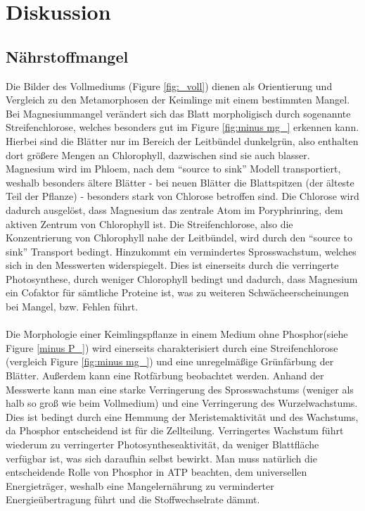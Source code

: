 \documentclass[10pt,a4paper]{article}
\begin{document}
	\section{Diskussion}
	\subsection{Nährstoffmangel}
	Die Bilder des Vollmediums (Figure \ref{fig:_voll}) dienen als Orientierung und Vergleich zu den Metamorphosen der Keimlinge mit einem bestimmten Mangel.\\
	Bei Magnesiummangel verändert sich das Blatt morpholigisch durch sogenannte Streifenchlorose, welches besonders gut im Figure \ref{fig:minus mg_} erkennen kann. Hierbei sind die Blätter nur im Bereich der Leitbündel dunkelgrün, also enthalten dort größere Mengen an Chlorophyll, dazwischen sind sie auch blasser. Magnesium wird im Phloem, nach dem “source to sink”  Modell transportiert, weshalb besonders ältere Blätter - bei neuen Blätter die Blattspitzen (der älteste Teil der Pflanze) - besonders stark von Chlorose betroffen sind. Die Chlorose wird dadurch ausgelöst, dass Magnesium das zentrale Atom im Poryphrinring, dem aktiven Zentrum von Chlorophyll ist. Die Streifenchlorose, also die Konzentrierung von Chlorophyll nahe der Leitbündel, wird durch den “source to sink” Transport bedingt. Hinzukommt ein vermindertes Sprosswachstum, welches sich in den Messwerten widerspiegelt. Dies ist einerseits durch die verringerte Photosynthese, durch weniger Chlorophyll bedingt und dadurch, dass Magnesium ein Cofaktor für sämtliche Proteine ist, was zu weiteren Schwächeerscheinungen bei Mangel, bzw. Fehlen führt. \\
	  \\
	Die Morphologie einer Keimlingspflanze in einem Medium ohne Phosphor(siehe Figure \ref{minus P_}) wird einerseits charakterisiert durch eine Streifenchlorose (vergleich Figure \ref{fig:minus mg_}) und eine unregelmäßige Grünfärbung der Blätter. Außerdem kann eine Rotfärbung beobachtet werden. Anhand der Messwerte kann man eine starke Verringerung des Sprosswachstums (weniger als halb so groß wie beim Vollmedium) und eine Verringerung des Wurzelwachstums. Dies ist bedingt durch eine Hemmung der Meristemaktivität und des Wachstums, da Phosphor entscheidend ist für die Zellteilung. Verringertes Wachstum führt wiederum zu verringerter Photosyntheseaktivität, da weniger Blattfläche verfügbar ist, was sich daraufhin selbst bewirkt. Man muss natürlich die entscheidende Rolle von Phosphor in ATP beachten, dem universellen Energieträger, weshalb eine Mangelernährung zu verminderter Energieübertragung führt und die Stoffwechselrate dämmt.\\
\end{document}
